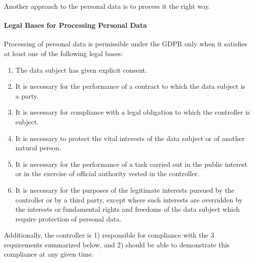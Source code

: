 Another approach to the personal data is to process it the right way.

\paragraph{Legal Bases for Processing Personal Data}
\label{sec:legal-bases-processing-personal-data}
Processing of personal data is permissible under the GDPR only when it satisfies at least one of the following legal bases:
\begin{enumerate}
    \item The data subject has given explicit consent.
    \item It is necessary for the performance of a contract to which the data subject is a party.
    \item It is necessary for compliance with a legal obligation to which the controller is subject.
    \item It is necessary to protect the vital interests of the data subject or of another natural person.
    \item It is necessary for the performance of a task carried out in the public interest or in the exercise of official authority vested in the controller.
    \item It is necessary for the purposes of the legitimate interests pursued by the controller or by a third party, except where such interests are overridden by the interests or fundamental rights and freedoms of the data subject which require protection of personal data.
\end{enumerate}

Additionally, the controller is 1) responsible for compliance with the 3 requirements summarized below, and 2) should be able to demonstrate this compliance at any given time.

